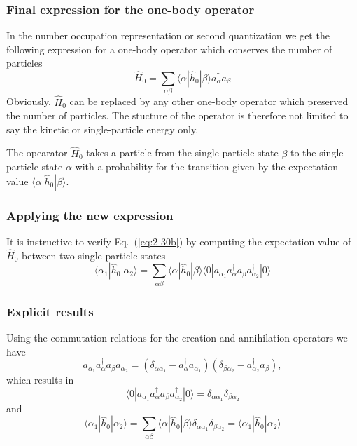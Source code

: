\documentclass{beamer}
\begin{document}
\begin{frame}
\frametitle{Final expression for the one-body operator}

In the number occupation representation or second quantization we get the following expression for a one-body 
operator which conserves the number of particles
\begin{equation}
	\hat{H}_0 = \sum_{\alpha\beta} \langle \alpha|\hat{h}_0|\beta\rangle a_\alpha^{\dagger} a_\beta \label{eq:2-30b}
\end{equation}
Obviously, $\hat{H}_0$ can be replaced by any other one-body  operator which preserved the number
of particles. The stucture of the operator is therefore not limited to say the kinetic or single-particle energy only.

The opearator $\hat{H}_0$ takes a particle from the single-particle state $\beta$  to the single-particle state $\alpha$ 
with a probability for the transition given by the expectation value $\langle \alpha|\hat{h}_0|\beta\rangle$.
\end{frame}

\begin{frame}
\frametitle{Applying the new expression}

It is instructive to verify Eq.~(\ref{eq:2-30b}) by computing the expectation value of $\hat{H}_0$ 
between two single-particle states
\begin{equation}
	\langle \alpha_1|\hat{h}_0|\alpha_2\rangle = \sum_{\alpha\beta} \langle \alpha|\hat{h}_0|\beta\rangle
		\langle 0|a_{\alpha_1}a_\alpha^{\dagger} a_\beta a_{\alpha_2}^{\dagger}|0\rangle \label{eq:2-30c}
\end{equation}
\end{frame}

\begin{frame}
\frametitle{Explicit results}

Using the commutation relations for the creation and annihilation operators we have 
\begin{equation}
a_{\alpha_1}a_\alpha^{\dagger} a_\beta a_{\alpha_2}^{\dagger} = (\delta_{\alpha \alpha_1} - a_\alpha^{\dagger} a_{\alpha_1} )(\delta_{\beta \alpha_2} - a_{\alpha_2}^{\dagger} a_{\beta} ), \label{eq:2-30d}
\end{equation}
which results in
\begin{equation}
\langle 0|a_{\alpha_1}a_\alpha^{\dagger} a_\beta a_{\alpha_2}^{\dagger}|0\rangle = \delta_{\alpha \alpha_1} \delta_{\beta \alpha_2} \label{eq:2-30e}
\end{equation}
and
\begin{equation}
\langle \alpha_1|\hat{h}_0|\alpha_2\rangle = \sum_{\alpha\beta} \langle \alpha|\hat{h}_0|\beta\rangle\delta_{\alpha \alpha_1} \delta_{\beta \alpha_2} = \langle \alpha_1|\hat{h}_0|\alpha_2\rangle \label{eq:2-30f}
\end{equation}
\end{frame}
\end{document}
